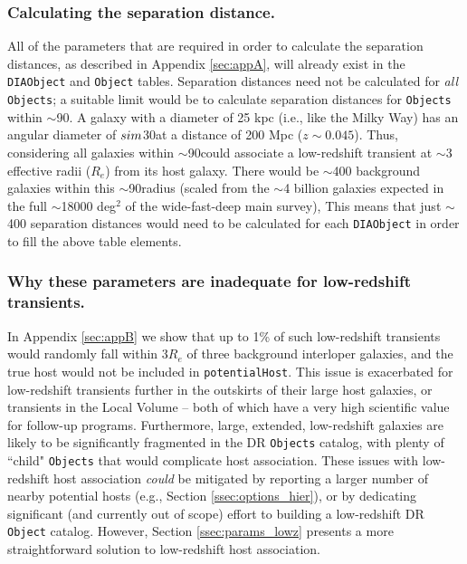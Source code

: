 \documentclass[DM,authoryear,toc]{lsstdoc}
\begin{document}
\subsubsection{Calculating the separation distance.}\label{sssec:params_trans_comp}
All of the parameters that are required in order to calculate the separation distances, as described in Appendix \ref{sec:appA}, will already exist in the {\tt DIAObject} and {\tt Object} tables.
Separation distances need not be calculated for \textit{all} {\tt Objects}; a suitable limit would be to calculate separation distances for {\tt Objects} within $\sim$90\arcsec.
A galaxy with a diameter of 25 kpc (i.e., like the Milky Way) has an angular diameter of $\\sim$30\arcsec at a distance of 200 Mpc ($z\sim0.045$).
Thus, considering all galaxies within $\sim$90\arcsec could associate a low-redshift transient at $\sim$3 effective radii ($R_e$) from its host galaxy.
There would be $\sim$400 background galaxies within this $\sim$90\arcsec radius (scaled from the $\sim$4 billion galaxies expected in the full $\sim$18000 deg$^2$ of the wide-fast-deep main survey), 
This means that just $\sim$400 separation distances would need to be calculated for each {\tt DIAObject} in order to fill the above table elements. 

\subsubsection{Why these parameters are inadequate for low-redshift transients.}\label{sssec:params_trans_fail}
In Appendix \ref{sec:appB} we show that up to 1\% of such low-redshift transients would randomly fall within $3R_e$ of three background interloper galaxies, and the true host would not be included in {\tt potentialHost}.
This issue is exacerbated for low-redshift transients further in the outskirts of their large host galaxies, or transients in the Local Volume -- both of which have a very high scientific value for follow-up programs.
Furthermore, large, extended, low-redshift galaxies are likely to be significantly fragmented in the DR {\tt Objects} catalog, with plenty of ``child" {\tt Objects} that would complicate host association.
These issues with low-redshift host association \textit{could} be mitigated by reporting a larger number of nearby potential hosts (e.g., Section \ref{ssec:options_hier}), or by dedicating significant (and currently out of scope) effort to building a low-redshift DR {\tt Object} catalog.
However, Section \ref{ssec:params_lowz} presents a more straightforward solution to low-redshift host association.
\end{document}
